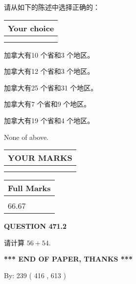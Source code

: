\documentclass{ctexart}
\begin{document}
  
请从如下的陈述中选择正确的：
  
  
\noindent\hspace{3.0in} \begin{tabular}{|l|}
\hline
Your choice \\
\hline
 \\ 
 \\ 
\hline
\end{tabular}
  
  
 
 
加拿大有10 个省和3 个地区。
 
 
加拿大有12 个省和3 个地区。
 
 
加拿大有25 个省和31 个地区。
 
 
加拿大有7 个省和9 个地区。
 
 
加拿大有19 个省和4 个地区。
 
 
 None of above.
 
 
  
\vspace{0.2in}
  
\noindent\begin{tabular}{|l|}
\hline
 YOUR MARKS  \\
\hline
 \\ 
 \\ 
\hline
\end{tabular}
\hspace{0.05in} \begin{tabular}{|l|}
\hline
 Full Marks  \\
\hline
 \\ 
66.67 \\
\hline
\end{tabular}
{\textbf{\Large{QUESTION
471.2 
}}}
  
  
 
请计算 $ %
56 +  %
54 $.
 

 

 
   
   
 \vspace{0.2in}
 
   
   
   
   
\vspace{1.0in} 
{\textbf{\large{ *** END OF PAPER, THANKS *** }}} 
   
   
\hspace{1.0in} By: 
 239 ( 416 ,  613 )
   
\end{document}
